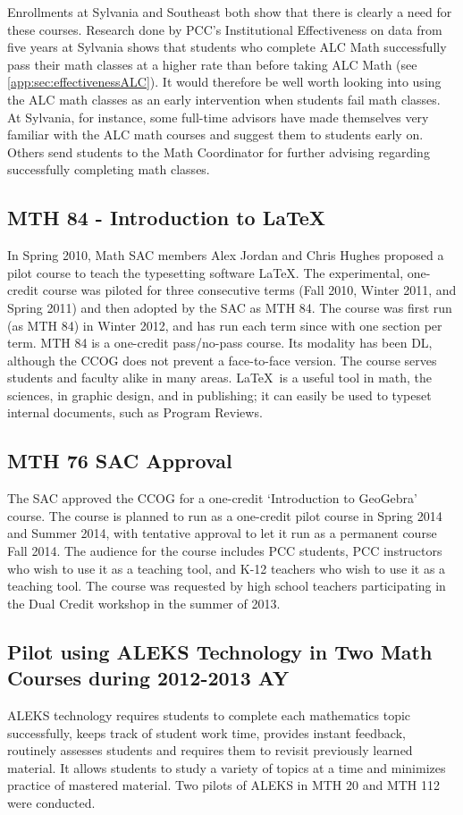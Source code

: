 Enrollments at Sylvania and Southeast both show that there is clearly a need for
these courses.  Research done by PCC's Institutional Effectiveness on data from
five years at Sylvania shows that students who complete ALC Math successfully
pass their math classes at a higher rate than before taking ALC Math  (see
\vref{app:sec:effectivenessALC}).  It would therefore be well worth looking into
using the ALC math classes as an early intervention when students fail math classes.
At Sylvania, for instance, some
full-time advisors have made themselves very familiar with the ALC math courses and
suggest them to students early on.  Others send students to the Math Coordinator for
further advising regarding successfully completing math classes.
 
\subsection{MTH 84 - Introduction to \LaTeX}\label{other:sec:mth84}
In Spring 2010, Math SAC members Alex Jordan and Chris Hughes proposed a pilot
course to teach the typesetting software \LaTeX.  The experimental, one-credit course was piloted for
three consecutive terms (Fall 2010, Winter 2011, and Spring 2011) and then
adopted by the SAC as MTH 84.  The course was first run (as MTH 84) in Winter
2012, and has run each term since with one section per term. MTH 84 is a one-credit 
pass/no-pass course. Its modality has been DL, although the CCOG does not
prevent a face-to-face version.  The course serves students and faculty alike in many areas.
\LaTeX\ is a useful tool in math, the sciences, in graphic design, and in
publishing; it can easily be used to typeset internal documents, such as Program Reviews.
 
\subsection{MTH 76 SAC Approval}
The SAC approved the CCOG for a one-credit `Introduction to GeoGebra' course. The course is
planned to run as a one-credit pilot course in Spring 2014 and Summer 2014, with tentative
approval to let it run as a permanent course Fall 2014.  The audience for the
course includes PCC students, PCC instructors who wish to use it as a teaching
tool, and K-12 teachers who wish to use it as a teaching tool.  The course was
requested by high school teachers participating in the Dual Credit workshop in
the summer of 2013.

\subsection[ALEKS pilot]{Pilot using ALEKS Technology in Two Math Courses during 2012-2013 AY}\label{sec3:subset:alekspilot}
ALEKS technology requires students to complete each mathematics topic
successfully, keeps track of student work time, provides instant feedback,
routinely assesses students and requires them to revisit previously learned
material.  It allows students to study a variety of topics at a time and
minimizes practice of mastered material. Two pilots of ALEKS in MTH 20 and MTH
112 were conducted.

